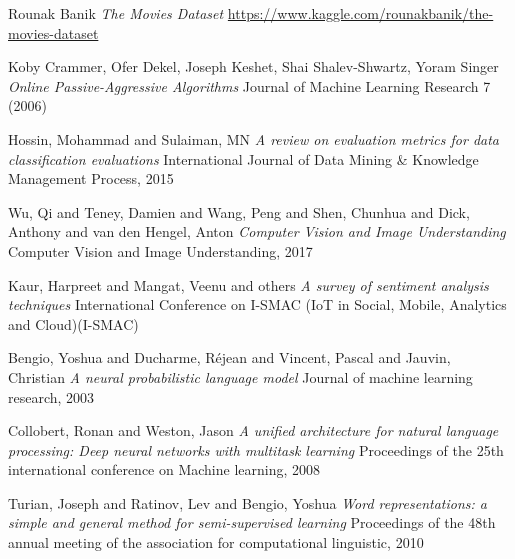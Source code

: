 \begin{thebibliography}{9}
Rounak Banik
\textit{The Movies Dataset}\newline
\url{https://www.kaggle.com/rounakbanik/the-movies-dataset}

Koby Crammer, Ofer Dekel, Joseph Keshet, Shai Shalev-Shwartz, Yoram Singer\newline
\textit{Online Passive-Aggressive Algorithms}\newline
Journal of Machine Learning Research 7 (2006) 

Hossin, Mohammad and Sulaiman, MN\newline
\textit{A review on evaluation metrics for data classification evaluations}\newline
International Journal of Data Mining \& Knowledge Management Process, 2015

Wu, Qi and Teney, Damien and Wang, Peng and Shen, Chunhua and Dick, Anthony and van den Hengel, Anton\newline
\textit{Computer Vision and Image Understanding}
Computer Vision and Image Understanding, 2017

Kaur, Harpreet and Mangat, Veenu and others\newline
\textit{A survey of sentiment analysis techniques} International Conference on I-SMAC (IoT in Social, Mobile, Analytics and Cloud)(I-SMAC)

Bengio, Yoshua and Ducharme, R{\'e}jean and Vincent, Pascal and Jauvin, Christian\newline
\textit{A neural probabilistic language model}\newline
Journal of machine learning research, 2003

Collobert, Ronan and Weston, Jason\newline
\textit{A unified architecture for natural language processing: Deep neural networks with multitask learning}\newline
Proceedings of the 25th international conference on Machine learning, 2008

Turian, Joseph and Ratinov, Lev and Bengio, Yoshua\newline
\textit{Word representations: a simple and general method for semi-supervised learning}\newline
Proceedings of the 48th annual meeting of the association for computational linguistic, 2010


\end{thebibliography}
